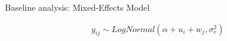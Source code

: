 \begin{frame}[fragile]{Baseline analysis: Mixed-Effects Model}
	
	\begin{minipage}{.45\textwidth}
		\begin{equation*}
			\begin{aligned}	
				y_{ij} \sim LogNormal(\alpha + u_i + w_j, \sigma_{e}^2) \\
			\end{aligned}
		\end{equation*}
	\end{minipage}	
	\hfill
	\begin{minipage}{.45\textwidth}	
	\end{minipage}

\end{frame}




